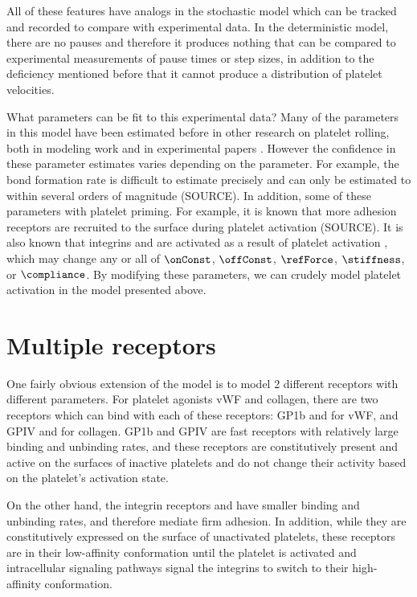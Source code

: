 All of these features have analogs in the stochastic model which can
be tracked and recorded to compare with experimental data. In the
deterministic model, there are no pauses and therefore it produces
nothing that can be compared to experimental measurements of pause
times or step sizes, in addition to the deficiency mentioned before
that it cannot produce a distribution of platelet velocities.

What parameters can be fit to this experimental data? Many of the
parameters in this model have been estimated before in other research
on platelet rolling, both in modeling work \cite{Fitzgibbon2014,
  Mody2008b, Wang2013} and in experimental papers \cite{Litvinov2011,
  Litvinov2012}. However the confidence in these parameter estimates
varies depending on the parameter. For example, the bond formation
rate is difficult to estimate precisely and can only be estimated to
within several orders of magnitude (SOURCE). In addition, some of
these parameters with platelet priming. For example, it is known that
more adhesion receptors are recruited to the surface during platelet
activation (SOURCE). It is also known that integrins 
and  are activated as a result of platelet activation
\cite{Kee2015}, which may change any or all of $\onConst$, $\offConst$,
$\refForce$, $\stiffness$, or $\compliance$. By modifying these
parameters, we can crudely model platelet activation in the model
presented above.

\section{Multiple receptors}
\label{sec:multiple-receptors}

One fairly obvious extension of the model is to model 2 different
receptors with different parameters. For platelet agonists vWF and
collagen, there are two receptors which can bind with each of these
receptors: GP1b and  for vWF, and GPIV and
 for collagen. GP1b and GPIV are fast receptors with
relatively large binding and unbinding rates, and these receptors are
constitutively present and active on the surfaces of inactive
platelets and do not change their activity based on the platelet's
activation state.

On the other hand, the integrin receptors  and
 have smaller binding and unbinding rates, and therefore
mediate firm adhesion. In addition, while they are constitutively
expressed on the surface of unactivated platelets, these receptors are
in their low-affinity conformation until the platelet is activated and
intracellular signaling pathways signal the integrins to switch to
their high-affinity conformation.

